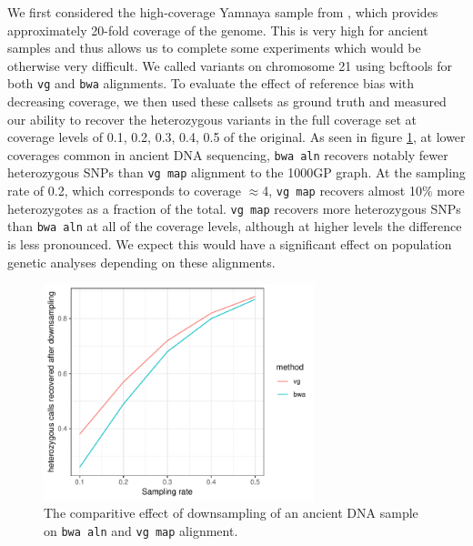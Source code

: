 We first considered the high-coverage Yamnaya sample from \cite{de2018first}, which provides approximately 20-fold coverage of the genome.
This is very high for ancient samples and thus allows us to complete some experiments which would be otherwise very difficult.
We called variants on chromosome 21 using bcftools \cite{li2009sequence} for both {\tt vg} and {\tt bwa} alignments.
To evaluate the effect of reference bias with decreasing coverage, we then used these callsets as ground truth and measured our ability to recover the heterozygous variants in the full coverage set at coverage levels of 0.1, 0.2, 0.3, 0.4, 0.5 of the original.
As seen in figure \ref{fig:aDNA_downsampling}, at lower coverages common in ancient DNA sequencing, {\tt bwa aln} recovers notably fewer heterozygous SNPs than {\tt vg map} alignment to the 1000GP graph.
At the sampling rate of 0.2, which corresponds to coverage $\approx$4, {\tt vg map} recovers almost 10\% more heterozygotes as a fraction of the total.
{\tt vg map} recovers more heterozygous SNPs than {\tt bwa aln} at all of the coverage levels, although at higher levels the difference is less pronounced.
We expect this would have a significant effect on population genetic analyses depending on these alignments.

\begin{figure}[htbp!]
  \centering
  \includegraphics[width=0.7\textwidth]{Chapter3/Figs/aDNA_downsampling.pdf}
  \caption[Downsampling a high-coverage aDNA sample]{
    The comparitive effect of downsampling of an ancient DNA sample on {\tt bwa aln} and {\tt vg map} alignment.
  }
  \label{fig:aDNA_downsampling}
\end{figure}

